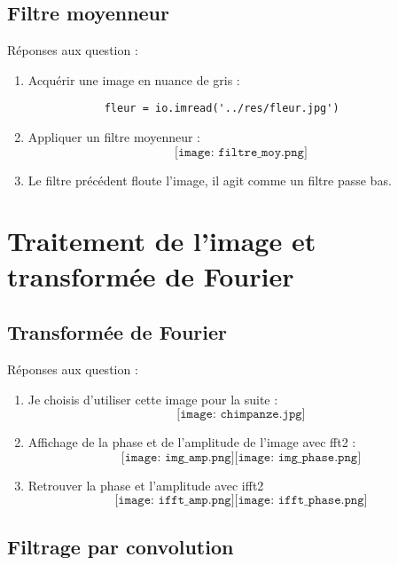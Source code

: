 \documentclass[12pt]{article}
\begin{document}
\subsection{Filtre moyenneur}
	
Réponses aux question :
\begin{enumerate}

	\item 
		Acquérir une image en nuance de gris : 
		\begin{verbatim}
			fleur = io.imread('../res/fleur.jpg') 
		\end{verbatim}
	\item
		Appliquer un filtre moyenneur : 
		$$
			\texttt{[image: filtre\_moy.png]}
		$$
		
	\item
		Le filtre précédent floute l'image, il agit comme un filtre passe bas.
		
\end{enumerate}

\section{Traitement de l'image et transformée de Fourier}

\subsection{Transformée de Fourier}

Réponses aux question :
\begin{enumerate}
	
	\item 
		Je choisis d'utiliser cette image pour la suite : 
		$$
			\texttt{[image: chimpanze.jpg]}
		$$
	
	\item 
		Affichage de la phase et de l'amplitude de l'image avec fft2 : 
		$$
			\texttt{[image: img\_amp.png]}
			\texttt{[image: img\_phase.png]}
		$$
		
	\item
		Retrouver la phase et l'amplitude avec ifft2 
		$$
			\texttt{[image: ifft\_amp.png]}
			\texttt{[image: ifft\_phase.png]}
		$$
		
\end{enumerate}

\subsection{Filtrage par convolution}
\end{document}
